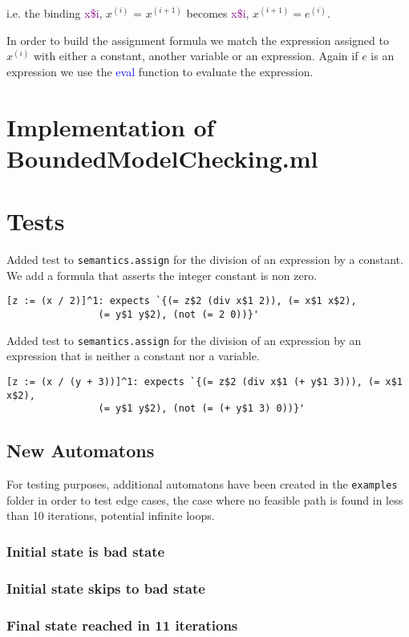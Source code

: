 \documentclass[letterpaper,12pt]{article}
\begin{document}
i.e. the binding \textcolor{purple}{x\$i}, $x^{(i)}$ = $x^{(i+1)}$ becomes \textcolor{purple}{x\$i}, $x^{(i+1)} = e^{(i)}$.

In order to build the assignment formula we match the expression assigned to $x^{(i)}$ with either a constant, another variable or an expression. Again if $e$ is an expression we use the \textcolor{blue}{eval} function to evaluate the expression.

  
\section{Implementation of BoundedModelChecking.ml}


\section{Tests}
Added test to \texttt{semantics.assign} for the division of an expression by a constant. We add a formula that asserts the integer constant is non zero.
\begin{verbatim}
[z := (x / 2)]^1: expects `{(= z$2 (div x$1 2)), (= x$1 x$2),
				(= y$1 y$2), (not (= 2 0))}'
\end{verbatim}
Added test to \texttt{semantics.assign} for the division of an expression by an expression that is neither a constant nor a variable.
\begin{verbatim}
[z := (x / (y + 3))]^1: expects `{(= z$2 (div x$1 (+ y$1 3))), (= x$1 x$2),
				(= y$1 y$2), (not (= (+ y$1 3) 0))}'
\end{verbatim}

\subsection{New Automatons}
For testing purposes, additional automatons have been created in the \texttt{examples} folder in order to test edge cases, the case where no feasible path is found in less than 10 iterations, potential infinite loops.
\subsubsection{Initial state is bad state}
\subsubsection{Initial state skips to bad state}
\subsubsection{Final state reached in 11 iterations}
\end{document}
